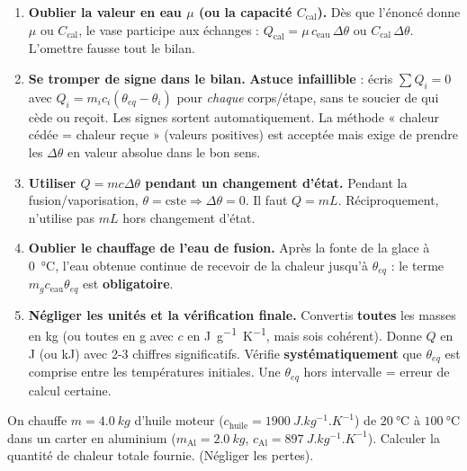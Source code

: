 \documentclass[11pt]{article}
\begin{document}
\begin{attention}
\begin{enumerate}
\item \textbf{Oublier la valeur en eau $\mu$ (ou la capacité $C_{\text{cal}}$).} Dès que l'énoncé donne $\mu$ ou $C_{\text{cal}}$, le vase participe aux échanges : $Q_{\text{cal}} = \mu\,c_{\text{eau}}\,\Delta\theta$ ou $C_{\text{cal}}\,\Delta\theta$. L'omettre fausse tout le bilan.
\item \textbf{Se tromper de signe dans le bilan.} \textbf{Astuce infaillible} : écris $\sum Q_i = 0$ avec $Q_i = m_i c_i(\theta_{eq}-\theta_i)$ pour \emph{chaque} corps/étape, sans te soucier de qui cède ou reçoit. Les signes sortent automatiquement. La méthode « chaleur cédée = chaleur reçue » (valeurs positives) est acceptée mais exige de prendre les $\Delta\theta$ en valeur absolue dans le bon sens.
\item \textbf{Utiliser $Q = mc\Delta\theta$ pendant un changement d'état.} Pendant la fusion/vaporisation, $\theta = \text{cste} \Rightarrow \Delta\theta = 0$. Il faut $Q = mL$. Réciproquement, n'utilise pas $mL$ hors changement d'état.
\item \textbf{Oublier le chauffage de l'eau de fusion.} Après la fonte de la glace à \SI{0}{\celsius}, l'eau obtenue continue de recevoir de la chaleur jusqu'à $\theta_{eq}$ : le terme $m_g c_{\text{eau}}\theta_{eq}$ est \textbf{obligatoire}.
\item \textbf{Négliger les unités et la vérification finale.} Convertis \textbf{toutes} les masses en \si{kg} (ou toutes en \si{g} avec $c$ en \si{J.g^{-1}.K^{-1}}, mais sois cohérent). Donne $Q$ en \si{J} (ou \si{kJ}) avec 2-3 chiffres significatifs. Vérifie \textbf{systématiquement} que $\theta_{eq}$ est comprise entre les températures initiales. Une $\theta_{eq}$ hors intervalle = erreur de calcul certaine.
\end{enumerate}
\end{attention}

\begin{exercice}
On chauffe $m = \num{4,0}\ \si{kg}$ d'huile moteur ($c_{\text{huile}} = \SI{1900}{J.kg^{-1}.K^{-1}}$) de $\SI{20}{\celsius}$ à $\SI{100}{\celsius}$ dans un carter en aluminium ($m_{\text{Al}} = \num{2,0}\ \si{kg}$, $c_{\text{Al}} = \SI{897}{J.kg^{-1}.K^{-1}}$). Calculer la quantité de chaleur totale fournie. (Négliger les pertes).
\end{exercice}
\end{document}
